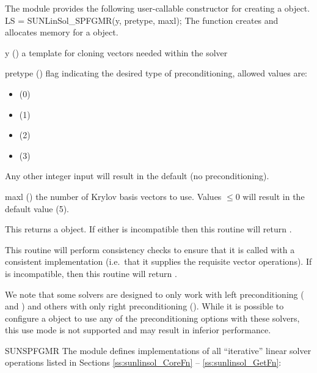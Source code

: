 The {\sunlinsolspfgmr} module provides the following user-callable constructor
for creating a \newline {} object.
%
%
{
  LS = SUNLinSol\_SPFGMR(y, pretype, maxl);
}
{
  The function  creates and allocates memory for
  a {\spfgmr} \newline {} object.
}
{
  \begin{args}[pretype]
  \item[y] ()
    a template for cloning vectors needed within the solver
  \item[pretype] ()
    flag indicating the desired type of preconditioning, allowed
    values are:
    \begin{itemize}
    \item {} (0)
    \item {} (1)
    \item {} (2)
    \item {} (3)
    \end{itemize}
    Any other integer input will result in the default (no
    preconditioning).
  \item[maxl] ()
    the number of Krylov basis vectors to use. Values $\le0$ will
    result in the default value (5).
  \end{args}
}
{
  This returns a  object.  If either  is
  incompatible then this routine will return .
}
{
  This routine will perform consistency checks to ensure that it is
  called with a consistent {\nvector} implementation (i.e.~that it
  supplies the requisite vector operations).  If  is
  incompatible, then this routine will return .

  We note that some {\sundials} solvers are designed to only work
  with left preconditioning ({\ida} and {\idas}) and others with only
  right preconditioning ({\kinsol}). While it is possible to configure
  a {\sunlinsolspfgmr} object to use any of the preconditioning options
  with these solvers, this use mode is not supported and may result in
  inferior performance.
}
{SUNSPFGMR}
%
%
The {\sunlinsolspfgmr} module defines implementations of all
``iterative'' linear solver operations listed in Sections
\ref{ss:sunlinsol_CoreFn} -- \ref{ss:sunlinsol_GetFn}:
